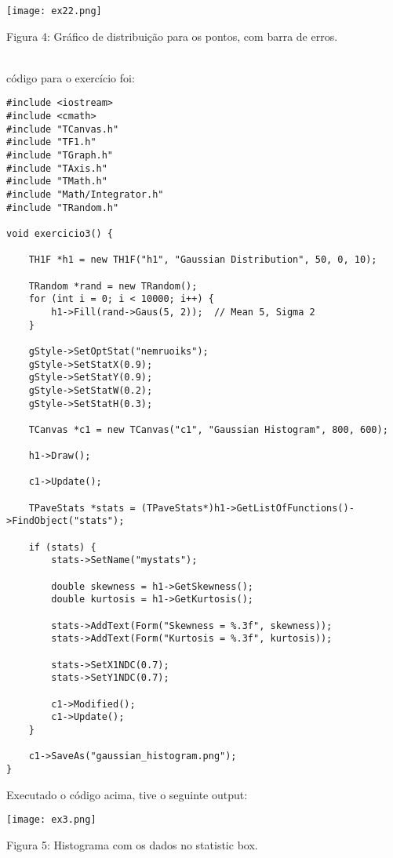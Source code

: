 \documentclass[a4 paper]{article}
\numberwithin{equation}{section}
\newcommand{\problem}[2]{~\\\fbox{\textbf{#1}}\hfill \newline\newline}
\newcommand{\0}{\mathbf{0}}
\begin{document}
\texttt{[image: ex22.png]}
\begin{center}
    Figura 4: Gráfico de distribuição para os pontos, com barra de erros.
\end{center}

\newpage

\problem{EXERCÍCIO 3 }

O código para o exercício foi:

\begin{lstlisting}
#include <iostream>
#include <cmath>
#include "TCanvas.h"
#include "TF1.h"
#include "TGraph.h"
#include "TAxis.h"
#include "TMath.h"
#include "Math/Integrator.h"
#include "TRandom.h"

void exercicio3() {

	TH1F *h1 = new TH1F("h1", "Gaussian Distribution", 50, 0, 10);

	TRandom *rand = new TRandom();
	for (int i = 0; i < 10000; i++) {
		h1->Fill(rand->Gaus(5, 2));  // Mean 5, Sigma 2
	}

	gStyle->SetOptStat("nemruoiks");
	gStyle->SetStatX(0.9);
	gStyle->SetStatY(0.9);
	gStyle->SetStatW(0.2);
	gStyle->SetStatH(0.3);

	TCanvas *c1 = new TCanvas("c1", "Gaussian Histogram", 800, 600);

	h1->Draw();

	c1->Update();

	TPaveStats *stats = (TPaveStats*)h1->GetListOfFunctions()->FindObject("stats");

	if (stats) {
		stats->SetName("mystats");

		double skewness = h1->GetSkewness();
		double kurtosis = h1->GetKurtosis();

		stats->AddText(Form("Skewness = %.3f", skewness));
		stats->AddText(Form("Kurtosis = %.3f", kurtosis));

		stats->SetX1NDC(0.7);
		stats->SetY1NDC(0.7);

		c1->Modified();
		c1->Update();
	}

	c1->SaveAs("gaussian_histogram.png");
}
\end{lstlisting}

Executado o código acima, tive o seguinte output:

\texttt{[image: ex3.png]}
\begin{center}
    Figura 5: Histograma com os dados no statistic box.
\end{center}

\newpage
\end{document}
